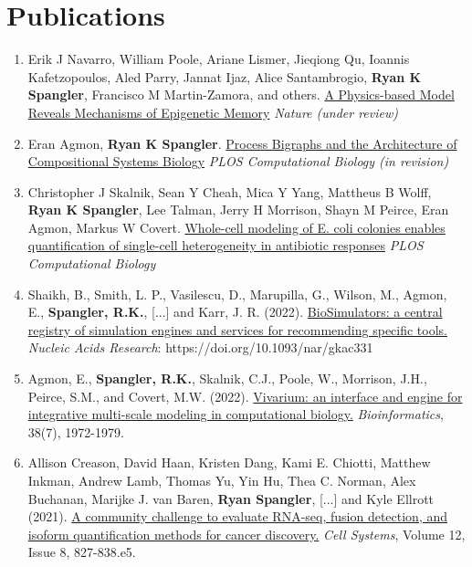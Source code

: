 \section{Publications}
\begin{enumerate}%
\item Erik J Navarro, William Poole, Ariane Lismer, Jieqiong Qu, Ioannis Kafetzopoulos, Aled Parry, Jannat Ijaz, Alice Santambrogio, \textbf{Ryan K Spangler}, Francisco M Martin-Zamora, and others. \href{https://www.biorxiv.org/content/biorxiv/early/2026/01/20/2026.01.16.699330.full.pdf}{A Physics-based Model Reveals Mechanisms of Epigenetic Memory} \textit{Nature (under review)}
\item Eran Agmon, \textbf{Ryan K Spangler}. \href{https://arxiv.org/pdf/2512.23754}{Process Bigraphs and the Architecture of Compositional Systems Biology} \textit{PLOS Computational Biology (in revision)}
\item Christopher J Skalnik, Sean Y Cheah, Mica Y Yang, Mattheus B Wolff, \textbf{Ryan K Spangler}, Lee Talman, Jerry H Morrison, Shayn M Peirce, Eran Agmon, Markus W Covert. \href{https://journals.plos.org/ploscompbiol/article?id=10.1371/journal.pcbi.1011232}{Whole-cell modeling of E. coli colonies enables quantification of single-cell heterogeneity in antibiotic responses} \textit{PLOS Computational Biology}
\item Shaikh, B., Smith, L. P., Vasilescu, D., Marupilla, G., Wilson, M., Agmon, E., \textbf{Spangler, R.K.}, [...] and Karr, J. R. (2022). \href{https://doi.org/10.1093/nar/gkac331}{BioSimulators: a central registry of simulation engines and services for recommending specific tools.} \textit{Nucleic Acids Research}: https://doi.org/10.1093/nar/gkac331
\item Agmon, E., \textbf{Spangler, R.K.}, Skalnik, C.J., Poole, W., Morrison, J.H., Peirce, S.M., and Covert, M.W. (2022). \href{https://academic.oup.com/bioinformatics/advance-article-abstract/doi/10.1093/bioinformatics/btac049/6522109}{Vivarium: an interface and engine for integrative multi-scale modeling in computational biology.} \textit{Bioinformatics}, 38(7), 1972-1979.
\item Allison Creason, David Haan, Kristen Dang, Kami E. Chiotti, Matthew Inkman, Andrew Lamb, Thomas Yu, Yin Hu, Thea C. Norman, Alex Buchanan, Marijke J. van Baren, \textbf{Ryan Spangler}, [...] and Kyle Ellrott (2021). \href{https://www.sciencedirect.com/science/article/pii/S2405471221002076}{A community challenge to evaluate RNA-seq, fusion detection, and isoform quantification methods for cancer discovery.} \textit{Cell Systems}, Volume 12, Issue 8, 827-838.e5. 

\end{enumerate}
